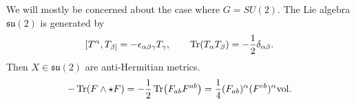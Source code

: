 We will mostly be concerned about the case where $G = SU(2)$.
The Lie algebra $\mathfrak{su}(2)$ is generated by
\begin{equation}
  [T^{\alpha}, T_{\beta]} = -\epsilon_{\alpha\beta\gamma} T_{\gamma}, \qquad \Tr(T_{\alpha} T_{\beta}) = -\frac{1}{2} \delta_{\alpha\beta}.
\end{equation}
Then $X \in \mathfrak{su}(2)$ are anti-Hermitian metrics.
\begin{equation}
  - \Tr(F \wedge \star F) = -\frac{1}{2} \Tr(F_{ab} F^{ab}) = \frac{1}{4} (F_{ab})^{\alpha} (F^{cb})^{\alpha} \text{vol}.
\end{equation}
